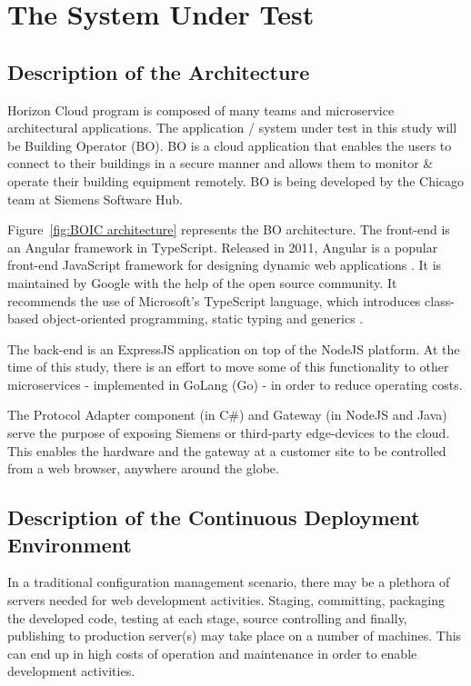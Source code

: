\documentclass[conference]{IEEEtran}
\begin{document}
\section{The System Under Test}
	\subsection{Description of the Architecture}
	
	Horizon Cloud program is composed of many teams and microservice architectural applications.
	The application / system under test in this study will be Building Operator (BO).
	BO is a cloud application that enables the users to connect to their buildings in a secure manner and allows them to monitor \& operate their building equipment remotely.
	BO is being developed by the Chicago team at Siemens Software Hub. 

	Figure~\ref{fig:BOIC architecture} represents the BO architecture.
	The front-end is an Angular framework in TypeScript.
	Released in 2011, Angular is a popular front-end JavaScript framework for designing dynamic web applications \cite{wiki:angular}.
	It is maintained by Google with the help of the open source community.
	It recommends the use of Microsoft's TypeScript language, which introduces class-based object-oriented programming, static typing and generics \cite{wiki:typescript}.
	
	The back-end is an ExpressJS application on top of the NodeJS platform. 
	At the time of this study, there is an effort to move some of this functionality to other microservices - implemented in GoLang (Go) - in order to reduce operating costs.
	
	The Protocol Adapter component (in C\#) and Gateway (in NodeJS and Java) serve the purpose of exposing Siemens or third-party edge-devices to the cloud. 
	This enables the hardware and the gateway at a customer site to be controlled from a web browser, anywhere around the globe.

	\subsection{Description of the Continuous Deployment Environment }
	
	In a traditional configuration management scenario, there may be a plethora of servers needed for web development activities.
	Staging, committing, packaging the developed code, testing at each stage, source controlling and finally, publishing to production server(s) may take place on a number of machines.
	This can end up in high costs of operation and maintenance in order to enable development activities.
	
\end{document}
